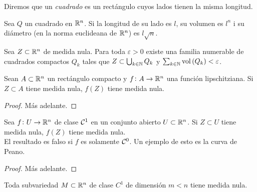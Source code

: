 \begin{defi}
    Diremos que un \textit{cuadrado} es un rectángulo cuyos lados tienen la misma
    longitud.
\end{defi}
\begin{prop*}
    Sea $Q$ un cuadrado en $\mathbb{R} ^n$. Si la longitud de su lado es $l$, su volumen
    es $l^n$ i su diámetro (en la norma euclideana de $\mathbb{R}^n$) es $l\sqrt{n}$.
\end{prop*}
\begin{prop}
    Sea $Z \subset \mathbb{R}^n$ de medida nula. Para toda $\varepsilon >0$ existe una
    familia numerable de cuadrados compactos $Q_k$ tales que $Z\subset
    \bigcup_{k \in \mathbb{N}} Q_k$ y $\sum_{k \in \mathbb{N}} \operatorname{vol} \left( Q_k \right) <
    \varepsilon$.
\end{prop}
\begin{lema}
    Sean $A\subset \mathbb{R}^n$ un rectángulo compacto y $f\colon A \to \mathbb{R}^n$ una
    función lipschitziana. Si $Z \subset A$ tiene medida nula, $f\left(Z \right)$
    tiene medida nula.
\end{lema}
\begin{proof}
    Más adelante.
\end{proof}
\begin{thm}
    Sea $f \colon U \to \mathbb{R}^n$ de clase $\mathcal{C} ^1$ en un conjunto abierto $U \subset
    \mathbb{R} ^n$. Si $Z \subset U$ tiene medida nula, $f\left( Z \right) $ tiene
    medida nula.\\
    El resultado es falso si $f$ es solamente $\mathcal{C} ^0$. Un ejemplo de esto es la
    curva de Peano.
\end{thm}
\begin{proof}
    Más adelante.
\end{proof}
\begin{col}
    Toda subvariedad $M \subset \mathbb{R}^n$ de clase $C^1$ de dimensión $m<n$ tiene
    medida nula.
\end{col}

